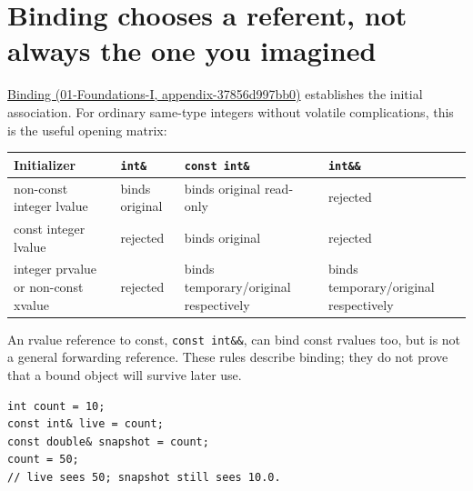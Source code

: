 \section{Binding chooses a referent, not always the one you imagined}\label{05-engine-i-ch003-binding-chooses-a-referent-not-always-the-one-you-imagined}

\href{../01-Foundations-I/main.pdf\#nameddest=appendix-37856d997bb0}{Binding (01-Foundations-I, appendix-37856d997bb0)} establishes the initial association. For ordinary same-type integers without volatile complications, this is the useful opening matrix:

{\def\LTcaptype{none} %
\begin{longtable}[]{@{}
  >{\raggedright\arraybackslash}p{}
  >{\raggedright\arraybackslash}p{}
  >{\raggedright\arraybackslash}p{}
  >{\raggedright\arraybackslash}p{}@{}}
\toprule\noalign{}
\begin{minipage}[b]{\linewidth}\raggedright
Initializer
\end{minipage} & \begin{minipage}[b]{\linewidth}\raggedright
\texttt{int\&}
\end{minipage} & \begin{minipage}[b]{\linewidth}\raggedright
\texttt{const\ int\&}
\end{minipage} & \begin{minipage}[b]{\linewidth}\raggedright
\texttt{int\&\&}
\end{minipage} \\
\midrule\noalign{}
\endhead
\bottomrule\noalign{}
\endlastfoot
non-const integer lvalue & binds original & binds original read-only & rejected \\
const integer lvalue & rejected & binds original & rejected \\
integer prvalue or non-const xvalue & rejected & binds temporary/original respectively & binds temporary/original respectively \\
\end{longtable}
}

An rvalue reference to const, \texttt{const\ int\&\&}, can bind const rvalues too, but is not a general forwarding reference. These rules describe binding; they do not prove that a bound object will survive later use.

\begin{verbatim}
int count = 10;
const int& live = count;
const double& snapshot = count;
count = 50;
// live sees 50; snapshot still sees 10.0.
\end{verbatim}

